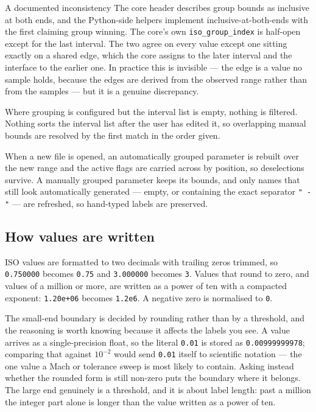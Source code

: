 \documentclass[11pt,a4paper,oneside]{report}
\newcommand{\code}[1]{\texttt{#1}}
\begin{document}
\begin{aoenote}{A documented inconsistency}
The core header describes group bounds as inclusive at both ends, and the
Python-side helpers implement inclusive-at-both-ends with the first claiming
group winning. The core's own \code{iso\_group\_index} is half-open except for
the last interval. The two agree on every value except one sitting exactly on a
shared edge, which the core assigns to the later interval and the interface to
the earlier one. In practice this is invisible --- the edge is a value no sample
holds, because the edges are derived from the observed range rather than from
the samples --- but it is a genuine discrepancy.
\end{aoenote}

Where grouping is configured but the interval list is empty, nothing is
filtered. Nothing sorts the interval list after the user has edited it, so
overlapping manual bounds are resolved by the first match in the order given.

When a new file is opened, an automatically grouped parameter is rebuilt over
the new range and the active flags are carried across by position, so
deselections survive. A manually grouped parameter keeps its bounds, and only
names that still look automatically generated --- empty, or containing the exact
separator \code{" - "} --- are refreshed, so hand-typed labels are preserved.

\subsection{How values are written}

ISO values are formatted to two decimals with trailing zeros trimmed, so
\code{0.750000} becomes \code{0.75} and \code{3.000000} becomes \code{3}. Values
that round to zero, and values of a million or more, are written as a power of
ten with a compacted exponent: \code{1.20e+06} becomes \code{1.2e6}. A negative
zero is normalised to \code{0}.

The small-end boundary is decided by rounding rather than by a threshold, and
the reasoning is worth knowing because it affects the labels you see. A value
arrives as a single-precision float, so the literal \code{0.01} is stored as
\code{0.00999999978}; comparing that against $10^{-2}$ would send \code{0.01}
itself to scientific notation --- the one value a Mach or tolerance sweep is
most likely to contain. Asking instead whether the rounded form is still
non-zero puts the boundary where it belongs. The large end genuinely is a
threshold, and it is about label length: past a million the integer part alone
is longer than the value written as a power of ten.
\end{document}

